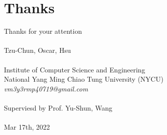 \documentclass{beamer}
\begin{document}
\section{Thanks}
\begin{frame}
    \begin{center}
        \Huge{Thanks for your attention} \\~\\
        \normalsize{Tzu-Chun, Oscar, Hsu} \\~\\
        \small{Institute of Computer Science and Engineering} \\
        \small{National Yang Ming Chiao Tung University (NYCU)} \\
        \small{\textit{vm3y3rmp40719@gmail.com}} \\~\\
        \small{Superviesd by Prof. Yu-Shun, Wang} \\~\\
        Mar 17th, 2022
    \end{center}
\end{frame}
\end{document}
